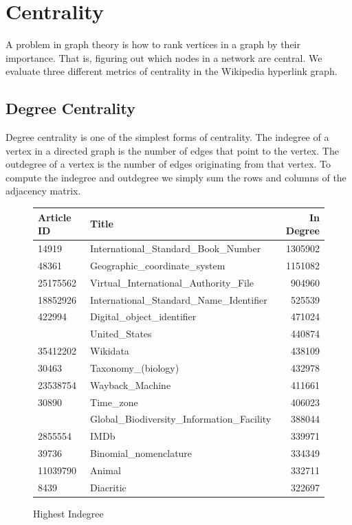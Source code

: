 \documentclass{article}
\begin{document}
\section{Centrality}

A problem in graph theory is how to rank vertices in a graph by their importance. That is, figuring out which nodes in a network are central.
We evaluate three different metrics of centrality in the Wikipedia hyperlink graph.


\subsection{Degree Centrality}

Degree centrality is one of the simplest forms of centrality.
The indegree of a vertex in a directed graph is the number of edges that point to the vertex.
The outdegree of a vertex is the number of edges originating from that vertex.
To compute the indegree and outdegree we simply sum the rows and columns of the adjacency matrix.






\begin{figure}[H]
    \centering
    \caption{Highest Indegree}
    \begin{tabular}{llr}
        \toprule
        Article ID & Title & In Degree\\
        \midrule
        14919 & International\_Standard\_Book\_Number & 1305902\\
        48361 & Geographic\_coordinate\_system & 1151082\\
        25175562 & Virtual\_International\_Authority\_File & 904960\\
        18852926 & International\_Standard\_Name\_Identifier & 525539\\
        422994 & Digital\_object\_identifier & 471024\\
        \addlinespace
        3434750 & United\_States & 440874\\
        35412202 & Wikidata & 438109\\
        30463 & Taxonomy\_(biology) & 432978\\
        23538754 & Wayback\_Machine & 411661\\
        30890 & Time\_zone & 406023\\
        \addlinespace
        2987862 & Global\_Biodiversity\_Information\_Facility & 388044\\
        2855554 & IMDb & 339971\\
        39736 & Binomial\_nomenclature & 334349\\
        11039790 & Animal & 332711\\
        8439 & Diacritic & 322697\\
        \bottomrule
    \end{tabular}
\end{figure}
    
\end{document}
